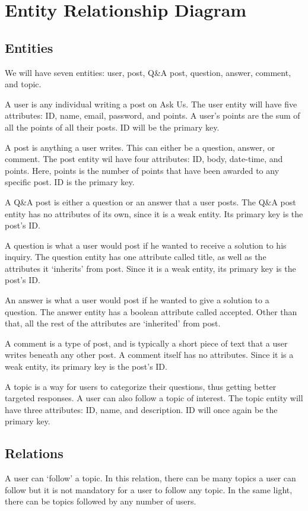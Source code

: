 \section{Entity Relationship Diagram}
\subsection{Entities}
We will have seven entities: user, post, Q\&A post, question, answer, comment, and topic.

A user is any individual writing a post on Ask Us. The user entity will have five attributes: ID, name, email, password, and points. A user's points are the sum of all the points of all their posts. ID will be the primary key.

A post is anything a user writes. This can either be a question, answer, or comment. The post entity wil have four attributes: ID, body, date-time, and points. Here, points is the number of points that have been awarded to any specific post. ID is the primary key.

A Q\&A post is either a question or an answer that a user posts. The Q\&A post entity has no attributes of its own, since it is a weak entity. Its primary key is the post's ID.

A question is what a user would post if he wanted to receive a solution to his inquiry. The question entity has one attribute called title, as well as the attributes it `inherits' from post. Since it is a weak entity, its primary key is the post's ID.

An answer is what a user would post if he wanted to give a solution to a question. The answer entity has a boolean attribute called accepted. Other than that, all the rest of the attributes are `inherited' from post.

A comment is a type of post, and is typically a short piece of text that a user writes beneath any other post. A comment itself has no attributes. Since it is a weak entity, its primary key is the post's ID.

A topic is a way for users to categorize their questions, thus getting better targeted responses. A user can also follow a topic of interest. The topic entity will have three attributes: ID, name, and description. ID will once again be the primary key.

\subsection{Relations}
A user can `follow' a topic. In this relation, there can be many topics a user can follow but it is not mandatory for a user to follow any topic. In the same light, there can be topics followed by any number of users.

